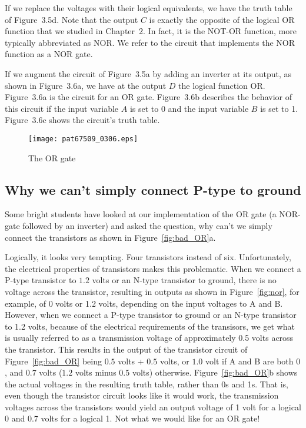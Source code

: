 \documentclass{patt}
\begin{document}
If we replace the voltages with their logical equivalents, we have the
truth table of Figure~3.5d.  Note that the output $C$ is exactly the
opposite of the logical OR function that we studied in Chapter~2.  In
fact, it is the NOT-OR function, more typically abbreviated as NOR.
We refer to the circuit that implements the NOR function as a NOR
gate.  

If we augment the circuit of Figure~3.5a by adding an inverter at its
output, as shown in Figure~3.6a, we have at the output $D$ the logical
function OR.  Figure~3.6a is the circuit for an OR gate.  Figure~3.6b
describes the behavior of this circuit if the input variable $A$ is
set to 0 and the input variable $B$ is set to 1.  Figure~3.6c shows
the circuit's truth table.  

\begin{figure}
\hspace*{-8pc}\begin{minipage}{36pc}
\centerline{\texttt{[image: pat67509\_0306.eps]}}
\caption{The OR gate}\label{fig:or}
\end{minipage}
\vspace{-12pt}
\end{figure}

\FloatBarrier
\subsection{Why we can't simply connect P-type to ground}

Some bright students have looked at our implementation of the OR gate (a 
NOR-gate followed by an inverter) and asked the question, why can't we
simply connect the transistors as shown in Figure~\ref{fig:bad_OR}a.

Logically, it looks very tempting.  Four transistors instead of six.
Unfortunately, the electrical properties of transistors makes this 
problematic.  When we connect a P-type transistor to $1.2$ volts or an N-type 
transistor to ground, there is no voltage across the transistor, resulting in 
outputs as shown in Figure~\ref{fig:nor}, for example, of 0 volts or 1.2 volts, 
depending on
the input voltages to A and B.  However, when we connect a P-type transistor
to ground or an  N-type transistor to 1.2 volts, because of the electrical 
requirements of the 
transisors, we get what is usually referred to as a transmission voltage of 
approximately 0.5 volts across the transistor.  This results in the output of 
the transistor circuit of Figure~\ref{fig:bad_OR} being $0.5$ volts + $0.5$ 
volts, or $1.0$ volt if A and B are both $0$, and $0.7$ volts ($1.2$ volts 
minus $0.5$ volts) otherwise.  Figure~\ref{fig:bad_OR}b shows the actual 
voltages in the resulting truth table, rather than 0s and 1s.  That is, even 
though the transistor circuit looks like it would work, 
the transmission voltages across the transistors 
would yield an output voltage of 1 volt for a logical 0 and 0.7 volts for 
a logical 1.  Not what we would like for an OR gate!
\end{document}
